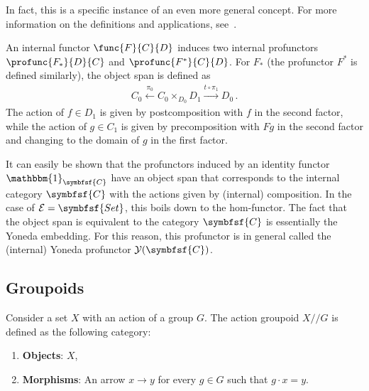     In fact, this is a specific instance of an even more general concept. For more information on the definitions and applications, see~\citet{mac_lane_categories_2013, johnstone_topos_2014}.

    \begin{construct}
        An internal functor $\func{F}{C}{D}$ induces two internal profunctors $\profunc{F_*}{D}{C}$ and $\profunc{F^*}{C}{D}$. For $F_*$ (the profunctor $F^*$ is defined similarly), the object span is defined as
        \begin{gather}
            C_0\overset{\pi_0}{\longleftarrow}C_0\times_{D_0} D_1\overset{t\circ\pi_1}{\longrightarrow}D_0\,.
        \end{gather}
        The action of $f\in D_1$ is given by postcomposition with $f$ in the second factor, while the action of $g\in C_1$ is given by precomposition with $Fg$ in the second factor and changing to the domain of $g$ in the first factor.

        It can easily be shown that the profunctors induced by an identity functor $\mathbbm{1}_{\symbfsf{C}}$ have an object span that corresponds to the internal category $\symbfsf{C}$ with the actions given by (internal) composition. In the case of $\mathcal{E}=\symbfsf{Set}$, this boils down to the hom-functor. The fact that the object span is equivalent to the category $\symbfsf{C}$ is essentially the Yoneda embedding. For this reason, this profunctor is in general called the (internal) Yoneda profunctor $\mathcal{Y}(\symbfsf{C})$.
    \end{construct}

\subsection{Groupoids}\label{section:groupoids}


    \begin{example}\label{cat:action_groupoid}
        Consider a set $X$ with an action of a group $G$. The action groupoid $X/\!\!/G$ is defined as the following category:
        \begin{enumerate}
            \item\textbf{Objects}: $X$,
            \item\textbf{Morphisms}: An arrow $x\rightarrow y$ for every $g\in G$ such that $g\cdot x=y$.
        \end{enumerate}
    \end{example}

